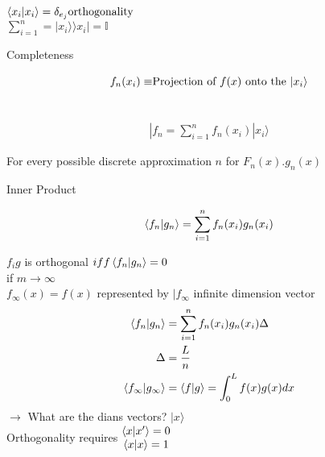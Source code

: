 \documentclass{article}
\begin{document}
\newpage
$\ev{x_{i}|x_{i}}=\delta_{e_{j}} \mbox{orthogonality}$\\
\vspace{1cm}
$\sum_{i=1}^{n}=|x_{i}\rangle \rangle x_{i}|=\mathbb{I}$\\

\begin{center}
Completeness
\end{center}

\begin{align*}
\intertext{$f_{n}(x_{i})\equiv$Projection of $f(x)$ onto the $|x_{i}\rangle$}\\ 
\end{align*}

\begin{align*}
|f_{n}=\sum_{i=1}^{n}f_{n}(x_{i})|x_{i}\rangle
\end{align*}
 
For every possible discrete approximation $n$ for $F_{n}(x).g_{n}(x)$\\

\begin{flushleft}
Inner Product
\end{flushleft} 

\begin{align*}
\ev{f_{n}|g_{n}}=\sum_{i=1}^{n}f_{n}(x_{i})g_{n}(x_{i})\\
\end{align*}

$f_{i}g$ is orthogonal $iff \ev{f_{n}|g_{n}}=0$\\

if $m \rightarrow \infty$\\

$f_{\infty}(x)=f(x)$ represented by $|f_{\infty}$ infinite dimension vector\\

\begin{align*}
\ev{f_{n}|g_{n}}&=\sum_{i=1}^{n}f_{n}(x_{i})g_{n}(x_{i}) \Delta\\
\Delta &=\frac{L}{n}\\
\ev{f_{\infty}|g_{\infty}}&=\ev{f|g}=\int_{0}^{L}f(x)g(x)dx
\end{align*}
\newpage
$\rightarrow$ What are the dians vectors? $|x\rangle$ \\
\vspace{1cm}
Orthogonality requires \hspace{2cm}$\begin{matrix}
\ev{x|x'}=0\\
\ev{x|x}=1
\end{matrix}$
\end{document}
